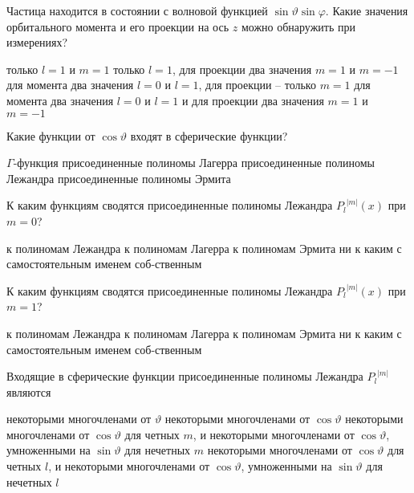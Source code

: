 \documentclass[11pt,a4paper]{exam}
\begin{document}
\begin{questions}
\question Частица находится в состоянии с волновой функцией $\sin \vartheta \sin \varphi $. Какие значения орбитального момента и его проекции на ось $z$ можно обнаружить при измерениях?
\begin{choices}
\choice только $l = 1$ и $m = 1$
\choice только $l = 1$, для проекции два значения $m = 1$ и $m =  - 1$
\choice для момента два значения $l = 0$ и $l = 1$, для проекции – только $m = 1$
\choice для момента два значения $l = 0$ и $l = 1$ и для проекции два значения $m = 1$ и $m =  - 1$
\end{choices}

\question Какие функции от $\cos \vartheta $ входят в сферические функции?
\begin{choices}
\choice $\Gamma $-функция             
\choice присоединенные полиномы Лагерра
\choice присоединенные полиномы Лежандра       
\choice присоединенные полиномы Эрмита
\end{choices}

\question К каким функциям сводятся присоединенные полиномы Лежандра ${P_l}^{|m|}(x)$ при $m = 0$?
\begin{choices}
\choice к полиномам Лежандра       
\choice к полиномам Лагерра
\choice к полиномам Эрмита         
\choice ни к каким с самостоятельным именем соб-ственным
\end{choices}

\question К каким функциям сводятся присоединенные полиномы Лежандра ${P_l}^{|m|}(x)$ при $m = 1$?
\begin{choices}
\choice к полиномам Лежандра       
\choice к полиномам Лагерра
\choice к полиномам Эрмита         
\choice ни к каким с самостоятельным именем соб-ственным
\end{choices}

\question Входящие в сферические функции присоединенные полиномы Лежандра ${P_l}^{|m|}$являются 
\begin{choices}
\choice некоторыми многочленами от $\vartheta $
\choice некоторыми многочленами от $\cos \vartheta $
\choice некоторыми многочленами от $\cos \vartheta $ для четных $m$, и некоторыми многочленами от $\cos \vartheta $, умноженными на $\sin \vartheta $ для нечетных $m$
\choice некоторыми многочленами от $\cos \vartheta $ для четных $l$, и некоторыми многочленами от $\cos \vartheta $, умноженными на $\sin \vartheta $ для нечетных $l$
\end{choices}


\end{questions}
\end{document}
